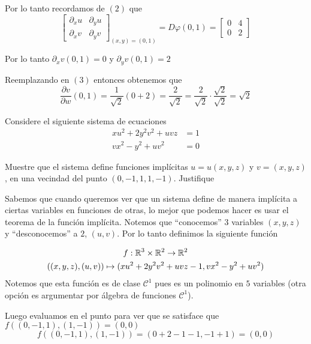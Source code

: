 \documentclass[a4paper,oneside,10.5pt]{article}
\begin{document}
Por lo tanto recordamos de $(2)$ que
\begin{equation*}
    \begin{bmatrix}
    \partial_x u & \partial_y u\\
    \partial_x v & \partial_y v
\end{bmatrix}_{(x, y) = (0, 1)}= D\varphi(0, 1) =\begin{bmatrix}
        0 & 4\\ 0 & 2
    \end{bmatrix}
\end{equation*}

Por lo tanto $\partial_x v(0, 1) = 0$ y $\partial_y v(0,1) = 2$

Reemplazando en $(3)$ entonces obtenemos que
\begin{equation*}
    \frac{\partial v}{\partial w}(0, 1) = \frac{1}{\sqrt2}(0 + 2) = \frac{2}{\sqrt{2}} = \frac{2}{\sqrt2} \cdot \frac{\sqrt2}{\sqrt2} = \sqrt{2}
\end{equation*}

\prob Considere el siguiente sistema de ecuaciones
\begin{align*}
    xu^2 + 2y^2v^2 + uvz &= 1\\
    vx^2 - y^2 + uv^2 &= 0
\end{align*}

Muestre que el sistema define funciones implícitas $u = u(x, y, z)$ y $v = (x,y,z)$, en una vecindad del punto $(0, -1, 1, 1, -1)$. Justifique

\sol Sabemos que cuando queremos ver que un sistema define de manera implícita a ciertas variables en funciones de otras, lo mejor que podemos hacer es usar el teorema de la función implícita. Notemos que ``conocemos'' $3$ variables $(x, y, z)$ y ``desconocemos'' a $2$, $(u, v)$. Por lo tanto definimos la siguiente función

\begin{gather*}
    f: \mathbb{R}^3 \times \mathbb{R}^2 \to \mathbb{R}^2\\
    ((x, y, z), (u, v)) \mapsto (xu^2 + 2y^2v^2 + uvz - 1, vx^2 - y^2 + uv^2)
\end{gather*}
Notemos que esta función es de clase $\mathcal{C}^1$ pues es un polinomio en $5$ variables (otra opción es argumentar por álgebra de funciones $\mathcal{C}^1$).

Luego evaluamos en el punto para ver que se satisface que $f((0, -1, 1), (1, -1)) = (0, 0)$
\begin{equation*}
    f((0, -1, 1), (1, -1)) = (0 + 2 - 1 - 1, -1 + 1) = (0, 0)
\end{equation*}
\end{document}
